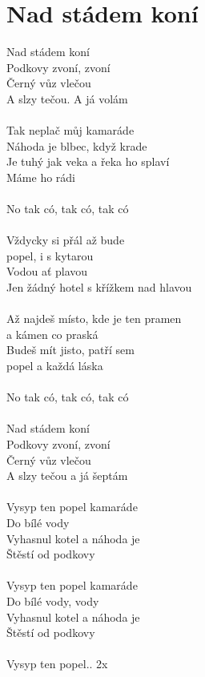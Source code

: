 \section{Nad stádem koní}
Nad stádem koní\\
Podkovy zvoní, zvoní\\
Černý vůz vlečou\\
A slzy tečou. A já volám\\
\\
Tak neplač můj kamaráde\\
Náhoda je blbec, když krade\\
Je tuhý jak veka a řeka ho splaví\\
Máme ho rádi\\
\\
No tak có, tak có, tak có\\
\\
Vždycky si přál až bude\\
popel, i s kytarou\\
Vodou ať plavou\\
Jen žádný hotel s křížkem nad hlavou\\
\\
Až najdeš místo, kde je ten pramen\\
a kámen co praská\\
Budeš mít jisto, patří sem\\
popel a každá láska\\
\\
No tak có, tak có, tak có\\
\\
Nad stádem koní\\
Podkovy zvoní, zvoní\\
Černý vůz vlečou\\
A slzy tečou a já šeptám\\
\\
Vysyp ten popel kamaráde\\
Do bílé vody\\
Vyhasnul kotel a náhoda je\\
Štěstí od podkovy\\
\\
Vysyp ten popel kamaráde\\
Do bílé vody, vody\\
Vyhasnul kotel a náhoda je\\
Štěstí od podkovy\\
\\
Vysyp ten popel.. 2x